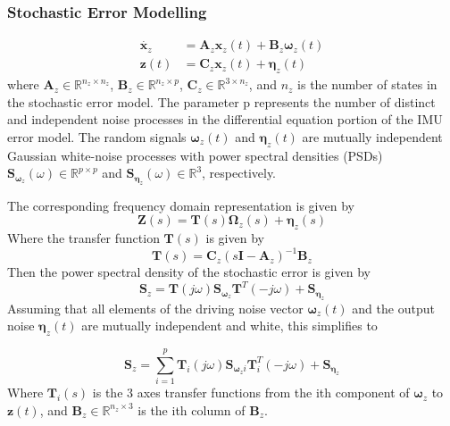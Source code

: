 \documentclass{article}
\begin{document}
\subsubsection{Stochastic Error Modelling}

\begin{align}
    \dot{\mathbf{x}_z} &= \mathbf{A}_z \mathbf{x}_z(t) + \mathbf{B}_z \boldsymbol{\omega}_z(t) \\
    \mathbf{z}(t) &= \mathbf{C}_z \mathbf{x}_z(t) + \boldsymbol{\eta}_z(t)
\end{align}
where $\mathbf{A}_z \in \mathbb{R}^{n_z \times n_z}$, $\mathbf{B}_z \in \mathbb{R}^{n_z \times p}$, $\mathbf{C}_z \in \mathbb{R}^{3 \times n_z}$, and $n_z$ is the number of states in the stochastic error model.
The parameter p represents the number of distinct and independent noise processes in the differential equation portion
of the IMU error model.
The random signals $\boldsymbol{\omega}_z(t)$ and $\boldsymbol{\eta}_z(t)$ are mutually independent Gaussian white-noise processes with power spectral densities (PSDs)
$\mathbf{S}_{\boldsymbol{\omega}_z}(\omega) \in \mathbb{R}^{p \times p}$ and $\mathbf{S}_{\boldsymbol{\eta}_z}(\omega) \in \mathbb{R}^{3}$, respectively.

The corresponding frequency domain representation is given by
\begin{equation}
    \mathbf{Z}(s) = \mathbf{T}(s)\boldsymbol{\Omega}_z(s) + \boldsymbol{\eta}_z(s)
\end{equation}
Where the transfer function $\mathbf{T}(s)$ is given by
\begin{equation}
    \mathbf{T}(s) = \mathbf{C}_z (s\mathbf{I} - \mathbf{A}_z)^{-1} \mathbf{B}_z
\end{equation}
Then the power spectral density of the stochastic error is given by
\begin{equation}
    \mathbf{S}_{z} = \mathbf{T}(j\omega) \mathbf{S}_{\boldsymbol{\omega}_z} \mathbf{T}^T(-j\omega) + \mathbf{S}_{\boldsymbol{\eta}_z}
\end{equation}
Assuming that all elements of the driving noise vector
$\boldsymbol{\omega}_z(t)$ and the output noise $\boldsymbol{\eta}_z(t)$ are mutually independent
and white, this simplifies to

\begin{equation}
    \mathbf{S}_{z} = \sum_{i=1}^{p} \mathbf{T}_i(j\omega) \mathbf{S}_{\boldsymbol{\omega}_zi} \mathbf{T}_i^T(-j\omega) + \mathbf{S}_{\boldsymbol{\eta}_z}
\end{equation}
Where $\mathbf{T}_i(s)$ is the 3 axes transfer functions from the ith
component of $\boldsymbol{\omega}_z$ to $\mathbf{z}(t)$, and $\mathbf{B}_z \in \mathbb{R}^{n_z \times 3}$ is the ith column of $\mathbf{B}_z$.
\end{document}
